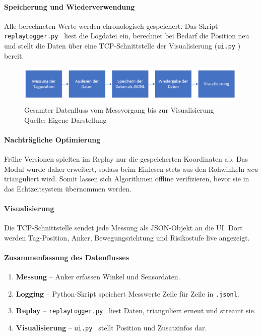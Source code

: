 \documentclass[a4paper, 12pt]{article} %
\begin{document}
\paragraph{Speicherung und Wiederverwendung}
Alle berechneten Werte werden chronologisch gespeichert.  
Das Skript \texttt{replayLogger.py \cite{tadic-studienarbeit-ui}} liest die Logdatei ein, berechnet bei Bedarf die Position neu und stellt die Daten über 
eine \acf{TCP}-Schnittstelle der Visualisierung (\texttt{ui.py} \cite{tadic-studienarbeit-ui}) bereit.

\begin{figure}[H]
    \centering
    \includegraphics[width=\linewidth]{images/Ablauf Funktion Datenlogger.png}
    \caption{Gesamter Datenfluss vom Messvorgang bis zur Visualisierung\\
            Quelle: Eigene Darstellung}
    \label{fig:datenlogger_flow_impl}
\end{figure}

\paragraph{Nachträgliche Optimierung}
Frühe Versionen spielten im Replay nur die gespeicherten Koordinaten ab.  
Das Modul wurde daher erweitert, sodass beim Einlesen stets aus den Rohwinkeln \textit{neu} trianguliert wird.  
Somit lassen sich Algorithmen offline verifizieren, bevor sie in das Echtzeitsystem übernommen werden.

\paragraph{Visualisierung}
Die \ac{TCP}-Schnittstelle sendet jede Messung als \ac{JSON}-Objekt an die \acf{UI}.  
Dort werden Tag-Position, Anker, Bewegungsrichtung und Risikostufe live angezeigt.

\clearpage

\paragraph{Zusammenfassung des Datenflusses}
\begin{enumerate}[leftmargin=2em]
  \item \textbf{Messung} – Anker erfassen Winkel und Sensordaten.  
  \item \textbf{Logging} – Python-Skript speichert Messwerte Zeile für Zeile in \texttt{.jsonl}.  
  \item \textbf{Replay} – \texttt{replayLogger.py \cite{tadic-studienarbeit-ui}} liest Daten, trianguliert erneut und streamt sie.  
  \item \textbf{Visualisierung} – \texttt{ui.py \cite{tadic-studienarbeit-ui}} stellt Position und Zusatzinfos dar.
\end{enumerate}
\end{document}
